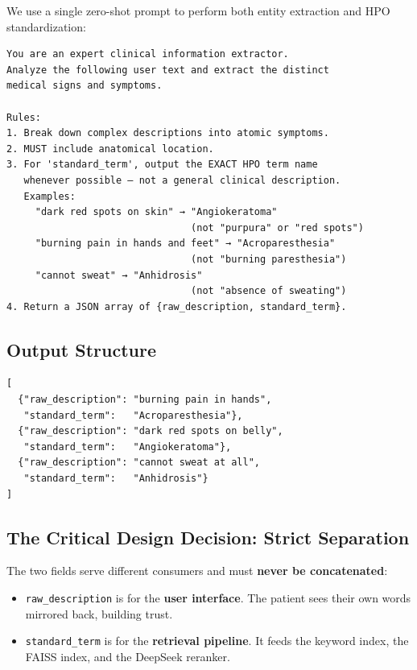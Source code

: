 \documentclass[11pt,a4paper]{article}
\begin{document}
We use a single zero-shot prompt to perform both entity extraction and HPO standardization:

\begin{lstlisting}[caption={Extraction prompt (simplified)},label={lst:extract}]
You are an expert clinical information extractor.
Analyze the following user text and extract the distinct
medical signs and symptoms.

Rules:
1. Break down complex descriptions into atomic symptoms.
2. MUST include anatomical location.
3. For 'standard_term', output the EXACT HPO term name
   whenever possible — not a general clinical description.
   Examples:
     "dark red spots on skin" → "Angiokeratoma"
                                (not "purpura" or "red spots")
     "burning pain in hands and feet" → "Acroparesthesia"
                                (not "burning paresthesia")
     "cannot sweat" → "Anhidrosis"
                                (not "absence of sweating")
4. Return a JSON array of {raw_description, standard_term}.
\end{lstlisting}

\subsection{Output Structure}

\begin{lstlisting}[caption={Example extraction output}]
[
  {"raw_description": "burning pain in hands",
   "standard_term":   "Acroparesthesia"},
  {"raw_description": "dark red spots on belly",
   "standard_term":   "Angiokeratoma"},
  {"raw_description": "cannot sweat at all",
   "standard_term":   "Anhidrosis"}
]
\end{lstlisting}

\subsection{The Critical Design Decision: Strict Separation}

The two fields serve different consumers and must \textbf{never be concatenated}:

\begin{itemize}[leftmargin=*]
  \item \texttt{raw\_description} is for the \textbf{user interface}. The patient sees their own words mirrored back, building trust.
  \item \texttt{standard\_term} is for the \textbf{retrieval pipeline}. It feeds the keyword index, the FAISS index, and the DeepSeek reranker.
\end{itemize}
\end{document}
